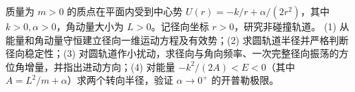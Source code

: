 质量为 \(m>0\) 的质点在平面内受到中心势 \(U(r)=-k/r+\alpha/(2r^2)\)，其中 \(k>0,\alpha>0\)，角动量大小为 \(L>0\)。记径向坐标 \(r>0\)，研究非碰撞轨道。
(1) 从能量和角动量守恒建立径向一维运动方程及有效势；(2) 求圆轨道半径并严格判断径向稳定性；(3) 对圆轨道作小扰动，求径向与角向频率、一次完整径向振荡的方位角增量，并指出进动方向；(4) 对能量 \(-k^2/(2A)<E<0\)（其中 \(A=L^2/m+\alpha\)）求两个转向半径，验证 \(\alpha\to0^+\) 的开普勒极限。

